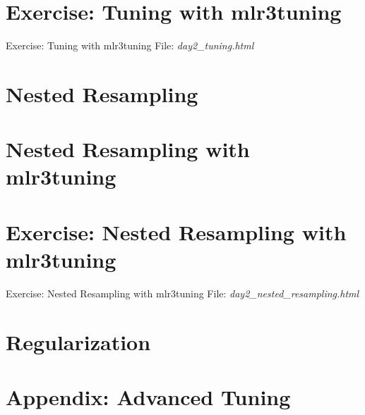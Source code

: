 \documentclass[13pt,compress]{beamer}
\begin{document}
\section{Exercise: Tuning with mlr3tuning}
\begin{frame}{Exercise: Tuning with mlr3tuning}
File: \textit{day2\_tuning.html}
\end{frame}
\section{Nested Resampling}


\section{Nested Resampling with mlr3tuning}

\section{Exercise: Nested Resampling with mlr3tuning}
\begin{frame}{Exercise: Nested Resampling with mlr3tuning}
File: \textit{day2\_nested\_resampling.html}
\end{frame}
\section{Regularization}





\section{Appendix: Advanced Tuning}

\end{document}
